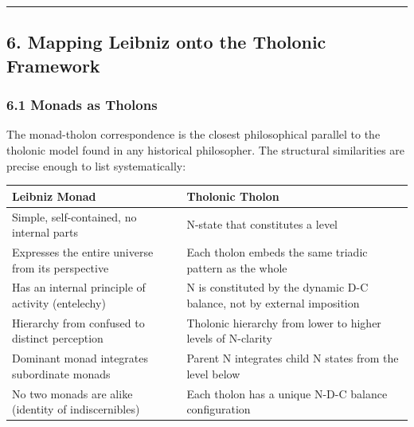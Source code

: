 \documentclass[
  11pt,
  letterpaper,
]{article}
\begin{document}
\begin{center}\rule{0.5\linewidth}{0.5pt}\end{center}

\subsection{6. Mapping Leibniz onto the Tholonic
Framework}\label{mapping-leibniz-onto-the-tholonic-framework}

\subsubsection{6.1 Monads as Tholons}\label{monads-as-tholons}

The monad-tholon correspondence is the closest philosophical parallel to
the tholonic model found in any historical philosopher. The structural
similarities are precise enough to list systematically:

\begin{longtable}[]{@{}
  >{\raggedright\arraybackslash}p{}
  >{\raggedright\arraybackslash}p{}@{}}
\toprule\noalign{}
\begin{minipage}[b]{\linewidth}\raggedright
Leibniz Monad
\end{minipage} & \begin{minipage}[b]{\linewidth}\raggedright
Tholonic Tholon
\end{minipage} \\
\midrule\noalign{}
\endhead
\bottomrule\noalign{}
\endlastfoot
Simple, self-contained, no internal parts & N-state that constitutes a
level \\
Expresses the entire universe from its perspective & Each tholon embeds
the same triadic pattern as the whole \\
Has an internal principle of activity (entelechy) & N is constituted by
the dynamic D-C balance, not by external imposition \\
Hierarchy from confused to distinct perception & Tholonic hierarchy from
lower to higher levels of N-clarity \\
Dominant monad integrates subordinate monads & Parent N integrates child
N states from the level below \\
No two monads are alike (identity of indiscernibles) & Each tholon has a
unique N-D-C balance configuration \\
\end{longtable}
\end{document}
